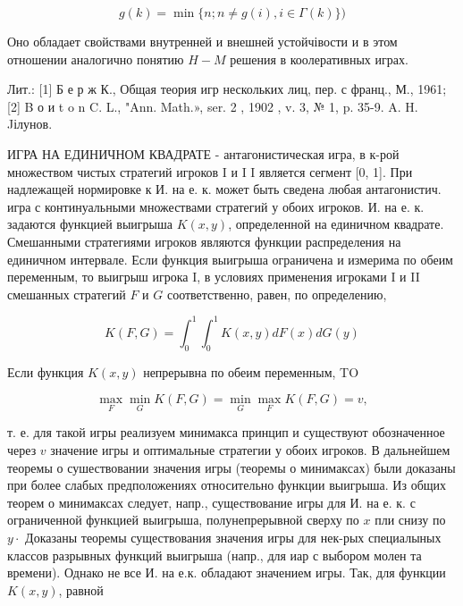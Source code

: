 \documentclass[10pt]{article}
\begin{document}
\[

g(k)=\min \{n ; n \neq g(i), i \in \Gamma(k)\})

\]



Оно обладает свойствами внутренней и внешней устойчівости и в этом отношении аналогично понятию $H-M$ решения в коолеративных играх.



Лит.: [1] Б е р ж К., Общая теория игр нескольких лиц, пер. с франц., М., 1961; [2] B о и t o n C. L., "Ann. Math.», ser. 2 , 1902 , v. 3, № 1, p. 35-9. A. H. Jілунов.



ИГРА НА ЕДИНИЧНОМ КВАДРАТЕ - антагонистическая игра, в к-рой множеством чистых стратегий игроков I и I I является сегмент [0, 1]. При надлежащей нормировке к И. на е. к. может быть сведена любая антагонистич. игра с континуальными множествами стратегий у обоих игроков. И. на е. к. задаются функцией выигрыша $K(x, y)$, определенной на единичном квадрате. Смешанными стратегиями игроков являются функции распределения на единичном интервале. Если функция выигрыша ограничена и измерима по обеим переменным, то выигрыш игрока I, в условиях применения игроками I и II смешанных стратегий $F$ и $G$ соответственно, равен, по определению,



\[

K(F, G)=\int_{0}^{1} \int_{0}^{1} K(x, y) d F(x) d G(y)

\]



Если функция $K(x, y)$ непрерывна по обеим переменным, TO



\[

\max _{F} \min _{G} K(F, G)=\min _{G} \max _{F} K(F, G)=v,

\]



т. е. для такой игры реализуем минимакса принцип и существуют обозначенное через $v$ значение игры и оптимальные стратегии у обоих игроков. В дальнейшем теоремы о сушествовании значения игры (теоремы о минимаксах) были доказаны при более слабых предположениях относительно функции выигрыша. Из общих теорем о минимаксах следует, напр., существование игры для И. на е. к. с ограниченной функцией выигрыша, полунепрерывной сверху по $x$ пли снизу по $y \cdot$ Доказаны теоремы существования значения игры для нек-рых специалыных классов разрывных функций выигрыша (напр., для иар с выбором молен та времени). Однако не все И. на е.к. обладают значением игры. Так, для функции $K(x, y)$, равной
\end{document}
